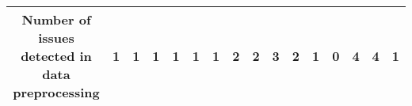 \begin{table*}[]
\begin{adjustbox}{width=\textwidth,center}
{\begin{tabular}{|cll|ccc|ccc|ccc|ccc|ccc|}
\multicolumn{3}{|c|}{\textbf{Number of issues detected in data preprocessing}}                                                                                                                                                                                                                                                                      & \multicolumn{1}{c|}{\textbf{1}}                                                                            & \multicolumn{1}{c|}{\textbf{1}}                                                                           & \textbf{1}                                                    & \multicolumn{1}{c|}{\textbf{1}}                                                                            & \multicolumn{1}{c|}{\textbf{1}}                                                                            & \textbf{1}                                                   & \multicolumn{1}{c|}{\textbf{2}}                                                                           & \multicolumn{1}{c|}{\textbf{2}}                                                                            & \textbf{3}                                                   & \multicolumn{1}{c|}{\textbf{2}}                                                                           & \multicolumn{1}{c|}{\textbf{1}}                                                                            & \textbf{0}                                                   & \multicolumn{1}{c|}{\textbf{4}}                                                                           & \multicolumn{1}{c|}{\textbf{4}}                                                                            & \textbf{1}                                                   \\ \hline

\end{tabular}}
\end{adjustbox}
\end{table*}
